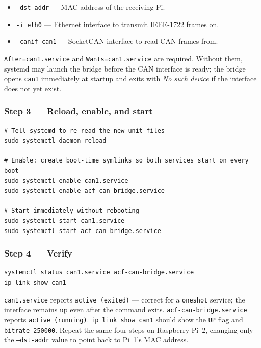 \documentclass[11pt,a4paper]{article}
\begin{document}
\begin{itemize}
    \item \texttt{--dst-addr} --- MAC address of the receiving Pi.
    \item \texttt{-i eth0} --- Ethernet interface to transmit IEEE-1722 frames on.
    \item \texttt{--canif can1} --- SocketCAN interface to read CAN frames from.
\end{itemize}

\texttt{After=can1.service} and \texttt{Wants=can1.service} are required.
Without them, systemd may launch the bridge before the CAN interface is ready;
the bridge opens \texttt{can1} immediately at startup and exits with
\emph{No such device} if the interface does not yet exist.

\subsubsection*{Step 3 --- Reload, enable, and start}

\begin{lstlisting}[caption={Register and activate both services}]
# Tell systemd to re-read the new unit files
sudo systemctl daemon-reload

# Enable: create boot-time symlinks so both services start on every boot
sudo systemctl enable can1.service
sudo systemctl enable acf-can-bridge.service

# Start immediately without rebooting
sudo systemctl start can1.service
sudo systemctl start acf-can-bridge.service
\end{lstlisting}

\subsubsection*{Step 4 --- Verify}

\begin{lstlisting}[caption={Confirm both services are active}]
systemctl status can1.service acf-can-bridge.service
ip link show can1
\end{lstlisting}

\texttt{can1.service} reports \texttt{active (exited)} --- correct for a
\texttt{oneshot} service; the interface remains up even after the command exits.
\texttt{acf-can-bridge.service} reports \texttt{active (running)}.
\texttt{ip link show can1} should show the \texttt{UP} flag and
\texttt{bitrate 250000}.  Repeat the same four steps on Raspberry Pi~2, changing
only the \texttt{--dst-addr} value to point back to Pi~1's MAC address.
\end{document}
